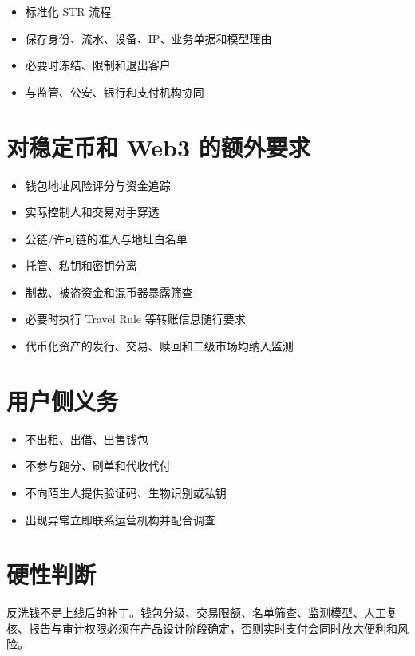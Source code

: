 \begin{itemize}
\tightlist
\item
  标准化 STR 流程
\item
  保存身份、流水、设备、IP、业务单据和模型理由
\item
  必要时冻结、限制和退出客户
\item
  与监管、公安、银行和支付机构协同
\end{itemize}

\section{对稳定币和 Web3
的额外要求}\label{ux5bf9ux7a33ux5b9aux5e01ux548c-web3-ux7684ux989dux5916ux8981ux6c42}

\begin{itemize}
\tightlist
\item
  钱包地址风险评分与资金追踪
\item
  实际控制人和交易对手穿透
\item
  公链/许可链的准入与地址白名单
\item
  托管、私钥和密钥分离
\item
  制裁、被盗资金和混币器暴露筛查
\item
  必要时执行 Travel Rule 等转账信息随行要求
\item
  代币化资产的发行、交易、赎回和二级市场均纳入监测
\end{itemize}

\section{用户侧义务}\label{ux7528ux6237ux4fa7ux4e49ux52a1}

\begin{itemize}
\tightlist
\item
  不出租、出借、出售钱包
\item
  不参与跑分、刷单和代收代付
\item
  不向陌生人提供验证码、生物识别或私钥
\item
  出现异常立即联系运营机构并配合调查
\end{itemize}

\section{硬性判断}\label{ux786cux6027ux5224ux65ad}

反洗钱不是上线后的补丁。钱包分级、交易限额、名单筛查、监测模型、人工复核、报告与审计权限必须在产品设计阶段确定，否则实时支付会同时放大便利和风险。


